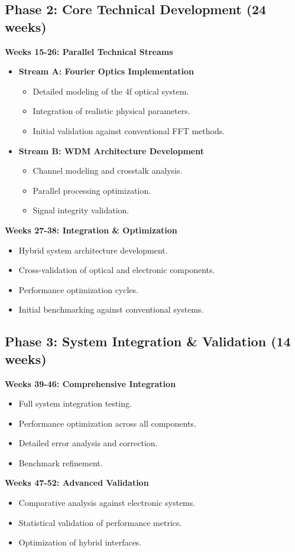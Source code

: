 \documentclass[conference]{IEEEtran}
\begin{document}
\subsection*{Phase 2: Core Technical Development (24 weeks)}
\textbf{Weeks 15-26: Parallel Technical Streams}
\begin{itemize}
    \item \textbf{Stream A: Fourier Optics Implementation}
    \begin{itemize}
        \item Detailed modeling of the 4f optical system.
        \item Integration of realistic physical parameters.
        \item Initial validation against conventional FFT methods.
    \end{itemize}
    \item \textbf{Stream B: WDM Architecture Development}
    \begin{itemize}
        \item Channel modeling and crosstalk analysis.
        \item Parallel processing optimization.
        \item Signal integrity validation.
    \end{itemize}
\end{itemize}
\textbf{Weeks 27-38: Integration \& Optimization}
\begin{itemize}
    \item Hybrid system architecture development.
    \item Cross-validation of optical and electronic components.
    \item Performance optimization cycles.
    \item Initial benchmarking against conventional systems.
\end{itemize}

\subsection*{Phase 3: System Integration \& Validation (14 weeks)}
\textbf{Weeks 39-46: Comprehensive Integration}
\begin{itemize}
    \item Full system integration testing.
    \item Performance optimization across all components.
    \item Detailed error analysis and correction.
    \item Benchmark refinement.
\end{itemize}
\textbf{Weeks 47-52: Advanced Validation}
\begin{itemize}
    \item Comparative analysis against electronic systems.
    \item Statistical validation of performance metrics.
    \item Optimization of hybrid interfaces.
\end{itemize}
\end{document}
